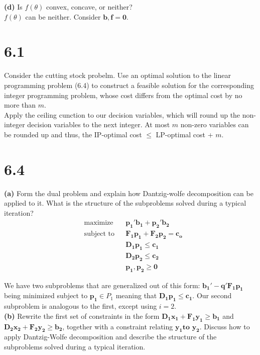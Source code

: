 \documentclass{article}
\begin{document}
\noindent
\textbf{(d)} Is $f(\theta)$ convex, concave, or neither? \\

\noindent
$f(\theta)$ can be neither.  Consider $\mathbf{b, f = 0}$.

\section*{6.1}
Consider the cutting stock probelm.  Use an optimal solution to the linear programming problem (6.4) to construct a feasible solution for the corresponding integer programming problem, whose cost differs from the optimal cost by no more than $m$.  \\

\noindent
Apply the ceiling cunction to our decision variables, which will round up the non-integer decision variables to the next integer.  At most $m$ non-zero variables can be rounded up and thus, the IP-optimal cost $\leq$ LP-optimal cost + $m$.

\section*{6.4}

\noindent
\textbf{(a)}
Form the dual problem and explain how Dantzig-wolfe decomposition can be applied to it.  What is the structure of the subproblems solved during a typical iteration? \\

\noindent
\begin{equation*}
\begin{aligned}
& \text{maximize} && \mathbf{p_1' b_1 + p_2' b_2} \\
& \text{subject to} &&  \mathbf{F_1 p_1 + F_2 p_2 = c_o} \\
& & & \mathbf{D_1 p_1 \leq c_1} \\
& & & \mathbf{D_2 p_2 \leq c_2} \\
& & & \mathbf{p_1, p_2 \geq 0}
\end{aligned}
\end{equation*}

\noindent
We have two subproblems that are generalized out of this form: $\mathbf{b_1' - q'F_1 p_1}$ being minimized subject to $\mathbf{p_1} \in P_1$ meaning that $\mathbf{D_1 p_1 \leq c_1}$.  Our second subproblem is analogous to the first, except using $i = 2$. \\

\noindent
\textbf{(b)} Rewrite the first set of constraints in the form $\mathbf{D_1 x_1 + F_1 y_1 \geq b_1}$ and $\mathbf{D_2 x_2 + F_2 y_2 \geq b_2}$, together with a constraint relating $\mathbf{y_1 \text{to } y_2}$.  Discuss how to apply Dantzig-Wolfe decomposition and describe the structure of the subproblems solved during a typical iteration. \\
\end{document}
